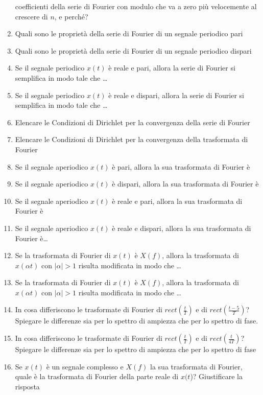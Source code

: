 \documentclass[
]{article}
\begin{document}
\begin{enumerate}
  coefficienti della serie di Fourier con modulo che va a zero più
  velocemente al crescere di \(n\), e perché?
\item
  Quali sono le proprietà della serie di Fourier di un segnale periodico
  pari
\item
  Quali sono le proprietà della serie di Fourier di un segnale periodico
  dispari
\item
  Se il segnale periodico \(x(t)\) è reale e pari, allora la serie di
  Fourier si semplifica in modo tale che \ldots{}
\item
  Se il segnale periodico \(x(t)\) è reale e dispari, allora la serie di
  Fourier si semplifica in modo tale che \ldots{}
\item
  Elencare le Condizioni di Dirichlet per la convergenza della serie di
  Fourier
\item
  Elencare le Condizioni di Dirichlet per la convergenza della
  trasformata di Fourier
\item
  Se il segnale aperiodico \(x(t)\) è pari, allora la sua trasformata di
  Fourier è
\item
  Se il segnale aperiodico \(x(t)\) è dispari, allora la sua trasformata
  di Fourier è
\item
  Se il segnale aperiodico \(x(t)\) è reale e pari, allora la sua
  trasformata di Fourier è
\item
  Se il segnale aperiodico \(x(t)\) è reale e dispari, allora la sua
  trasformata di Fourier è\ldots{}
\item
  Se la trasformata di Fourier di \(x(t)\) è \(X(f)\), allora la
  trasformata di \(x(\alpha t)\) con \(|\alpha| >1\) risulta modificata
  in modo che \ldots{}
\item
  Se la trasformata di Fourier di \(x(t)\) è \(X(f)\), allora la
  trasformata di \(x(\alpha t)\) con \(|\alpha| >1\) risulta modificata
  in modo che \ldots{}
\item
  In cosa differiscono le trasformate di Fourier di
  \(rect (\frac{t}{T})\) e di \(rect (\frac{t-5}{T})\)? Spiegare le
  differenze sia per lo spettro di ampiezza che per lo spettro di fase.
\item
  In cosa differiscono le trasformate di Fourier di
  \(rect(\frac{t}{T})\) e di \(rect(\frac{t}{4T})\)? Spiegare le
  differenze sia per lo spettro di ampiezza che per lo spettro di fase
\item
  Se \(x(t)\) è un segnale complesso e \(X(f)\) la sua trasformata di
  Fourier, quale è la trasformata di Fourier della parte reale di
  \(x(t\))? Giustificare la risposta

\end{enumerate}
\end{document}
